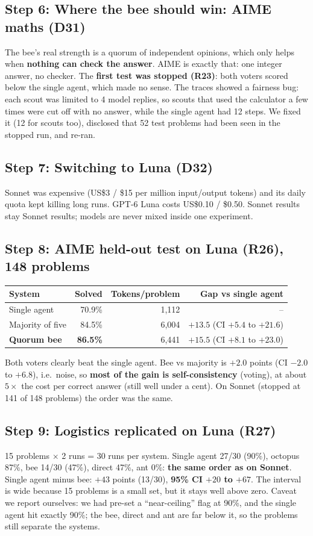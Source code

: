 \documentclass[11pt,a4paper]{article}
\begin{document}
\subsection*{Step 6: Where the bee should win: AIME maths (D31)}
The bee's real strength is a quorum of independent opinions, which only helps when \textbf{nothing can
check the answer}. AIME is exactly that: one integer answer, no checker. The \textbf{first test was stopped
(R23)}: both voters scored below the single agent, which made no sense. The traces showed a fairness bug:
each scout was limited to 4 model replies, so scouts that used the calculator a few times were cut off with
no answer, while the single agent had 12 steps. We fixed it (12 for scouts too), disclosed that 52 test
problems had been seen in the stopped run, and re-ran.

\subsection*{Step 7: Switching to Luna (D32)}
Sonnet was expensive (US\$3 / \$15 per million input/output tokens) and its daily quota kept killing long
runs. GPT-6 Luna costs US\$0.10 / \$0.50. Sonnet results stay Sonnet results; models are never mixed inside
one experiment.

\subsection*{Step 8: AIME held-out test on Luna (R26), 148 problems}
\begin{tabularx}{\linewidth}{@{}Lrrr@{}}
\toprule
\textbf{System} & \textbf{Solved} & \textbf{Tokens/problem} & \textbf{Gap vs single agent} \\
\midrule
Single agent & 70.9\% & 1,112 & -- \\
Majority of five & 84.5\% & 6,004 & $+13.5$ (CI $+5.4$ to $+21.6$) \\
\textbf{Quorum bee} & \textbf{86.5\%} & 6,441 & $\mathbf{+15.5}$ (CI $+8.1$ to $+23.0$) \\
\bottomrule
\end{tabularx}

Both voters clearly beat the single agent. Bee vs majority is $+2.0$ points (CI $-2.0$ to $+6.8$), i.e.\
noise, so \textbf{most of the gain is self-consistency} (voting), at about $5\times$ the cost per correct
answer (still well under a cent). On Sonnet (stopped at 141 of 148 problems) the order was the same.

\subsection*{Step 9: Logistics replicated on Luna (R27)}
15 problems $\times$ 2 runs = 30 runs per system. Single agent 27/30 (90\%), octopus 87\%, bee 14/30 (47\%),
direct 47\%, ant 0\%: \textbf{the same order as on Sonnet}. Single agent minus bee: $+43$ points
(13/30), \textbf{95\% CI $+20$ to $+67$}. The interval is wide because 15 problems is a small set, but it
stays well above zero. Caveat we report ourselves: we had pre-set a ``near-ceiling'' flag at 90\%, and the
single agent hit exactly 90\%; the bee, direct and ant are far below it, so the problems still separate the systems.
\end{document}
